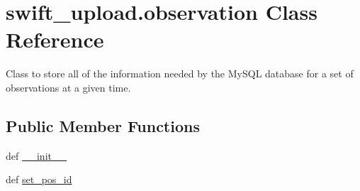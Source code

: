 \hypertarget{classswift__upload_1_1observation}{\section{swift\-\_\-upload.\-observation Class Reference}
\label{classswift__upload_1_1observation}
}


Class to store all of the information needed by the My\-S\-Q\-L database for a set of observations at a given time.  


\subsection*{Public Member Functions}
\begin{DoxyCompactItemize}
\item 
def \hyperlink{classswift__upload_1_1observation_adc476d37d9350c9a8026212b18ca064a}{\-\_\-\-\_\-init\-\_\-\-\_\-}
\item 
def \hyperlink{classswift__upload_1_1observation_abe0ec76289a38134e71c70edcd38fc29}{set\-\_\-pos\-\_\-id}
\end{DoxyCompactItemize}

